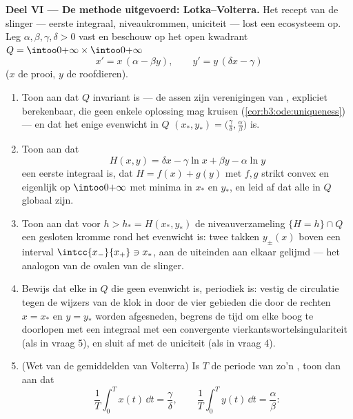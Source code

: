 \begin{problem}
\medskip
\noindent\textbf{Deel VI --- De methode uitgevoerd:
Lotka--Volterra.} Het recept van de slinger --- eerste integraal,
 niveaukrommen, uniciteit --- lost een ecosysteem op. Leg
$\alpha, \beta, \gamma, \delta > 0$ vast en beschouw op het open
kwadrant $Q = \intoo0{+\infty}\times\intoo0{+\infty}$
\[
x' = x\,(\alpha - \beta y), \qquad
y' = y\,(\delta x - \gamma)
\]
($x$ de prooi, $y$ de roofdieren).
\begin{enumerate}[resume]
  \item Toon aan dat $Q$ invariant is --- de assen zijn
        verenigingen van , expliciet berekenbaar, die geen
        enkele oplossing mag kruisen
        (\cref{cor:b3:ode:uniqueness}) --- en dat het enige
        evenwicht in $Q$ $(x_*, y_*) = \bigl(\frac\gamma\delta,
        \frac\alpha\beta\bigr)$ is.
  \item Toon aan dat
        \[
        H(x, y) = \delta x - \gamma\ln x + \beta y -
        \alpha\ln y
        \]
        een eerste integraal is, dat $H = f(x) + g(y)$ met $f, g$
        strikt convex en eigenlijk op $\intoo0{+\infty}$ met
        minima in $x_*$ en $y_*$, en leid af dat alle  in $Q$ globaal zijn.
  \item Toon aan dat voor $h > h_* = H(x_*, y_*)$ de
        niveauverzameling $\{H = h\}\cap Q$ een gesloten kromme
        rond het evenwicht is: twee  takken $y_\pm(x)$
        boven een  interval $\intcc{x_-}{x_+} \ni x_*$,
        aan de uiteinden aan elkaar gelijmd --- het analogon van
        de ovalen van de slinger.
  \item Bewijs dat elke  in $Q$ die geen evenwicht is,
        periodiek is: vestig de circulatie tegen de wijzers van
        de klok in door de vier gebieden die door de rechten $x =
        x_*$ en $y = y_*$ worden afgesneden, begrens de tijd om
        elke boog te doorlopen met een integraal met een
        convergente vierkantswortelsingulariteit (als in vraag
        5), en sluit af met de uniciteit (als in vraag 4).
  \item (Wet van de gemiddelden van Volterra) Is $T$ de periode
        van zo'n , toon dan aan dat
        \[
        \frac1T\int_0^Tx(t)\,\dd t = \frac\gamma\delta,
        \qquad
        \frac1T\int_0^Ty(t)\,\dd t = \frac\alpha\beta :
        \]

\end{enumerate}
\end{problem}
